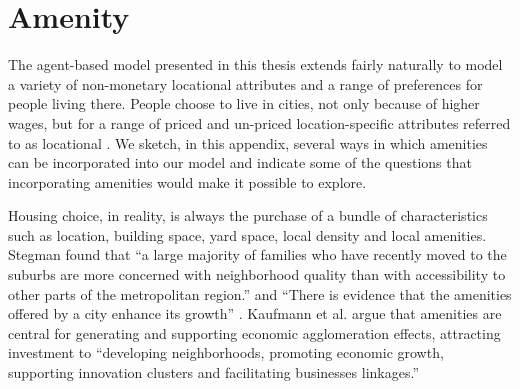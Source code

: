 \chapter{Amenity}\label{chapter-amenity}

The agent-based model presented in this thesis extends fairly naturally to model a variety of non-monetary locational attributes and a range of preferences for people living there. People choose to live in cities, not only because of higher wages, but for a range of priced and un-priced location-specific attributes referred to as locational .  We sketch, in this appendix, several ways in which amenities can be incorporated into our model and indicate some of the questions that incorporating amenities would make it possible to explore.

Housing choice, in reality, is always the purchase of a bundle of characteristics such as location, building space, yard space, local density and local amenities. %
Stegman \cite{stegmanAccessibilityModelsResidential1969} found that ``a large majority of families who have recently moved to the suburbs are more concerned with neighborhood quality than with accessibility to other parts of the metropolitan region.''  and ``There is evidence that the amenities offered by a city enhance its growth'' \cite{clarkAmenitiesDriveUrban2002, falckPhantomOperaCultural2011}. 
Kaufmann et al. \cite{kaufmannScalingUrbanAmenities2022} 
argue that amenities are central for generating and supporting economic agglomeration effects, attracting investment to ``developing neighborhoods, promoting economic growth, supporting innovation clusters and facilitating businesses linkages.''


